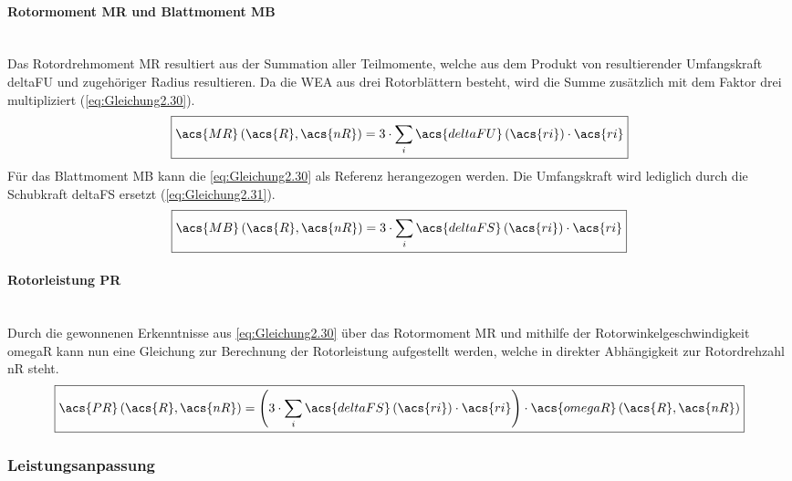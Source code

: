 \paragraph{Rotormoment \acs{MR} und Blattmoment \acs{MB}}\mbox{}\smallskip\\
Das Rotordrehmoment \acs{MR} resultiert aus der Summation aller Teilmomente, welche aus dem Produkt von resultierender Umfangskraft \acs{deltaFU} und zugehöriger Radius resultieren. Da die WEA aus drei Rotorblättern besteht, wird die Summe zusätzlich mit dem Faktor drei multipliziert (\autoref{eq:Gleichung2.30}).
\begin{equation}\label{eq:Gleichung2.30}
    \boxed{\acs{MR}\left(\acs{R}, \acs{nR}\right) = 3 \cdot \sum_{i}^{} \acs{deltaFU}\left(\acs{ri}\right) \cdot \acs{ri}}
\end{equation}
\newline
Für das Blattmoment \acs{MB} kann die \autoref{eq:Gleichung2.30} als Referenz herangezogen werden. Die Umfangskraft wird lediglich durch die Schubkraft \acs{deltaFS} ersetzt (\autoref{eq:Gleichung2.31}).
\begin{equation}\label{eq:Gleichung2.31}
    \boxed{\acs{MB}\left(\acs{R}, \acs{nR}\right) = 3 \cdot \sum_{i}^{} \acs{deltaFS}\left(\acs{ri}\right) \cdot \acs{ri}}
\end{equation}

\paragraph{Rotorleistung \acs{PR}}\mbox{}\smallskip\\
Durch die gewonnenen Erkenntnisse aus \autoref{eq:Gleichung2.30} über das Rotormoment \acs{MR} und mithilfe der Rotorwinkelgeschwindigkeit \acs{omegaR} kann nun eine Gleichung zur Berechnung der Rotorleistung aufgestellt werden, welche in direkter Abhängigkeit zur Rotordrehzahl \acs{nR} steht.
\begin{equation}
    \boxed{\acs{PR}\left(\acs{R}, \acs{nR}\right) = \left(3 \cdot \sum_{i}^{} \acs{deltaFS}\left(\acs{ri}\right) \cdot \acs{ri}\right) \cdot \acs{omegaR}\left(\acs{R}, \acs{nR}\right)}
\end{equation}
\newpage
\subsubsection{Leistungsanpassung}

